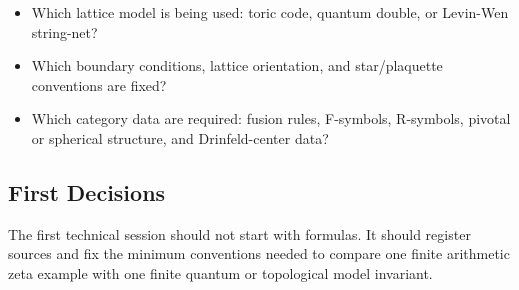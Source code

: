 \begin{itemize}
  \item Which lattice model is being used: toric code, quantum double, or
  Levin-Wen string-net?
  \item Which boundary conditions, lattice orientation, and star/plaquette
  conventions are fixed?
  \item Which category data are required: fusion rules, F-symbols, R-symbols,
  pivotal or spherical structure, and Drinfeld-center data?
\end{itemize}

\subsection{First Decisions}

The first technical session should not start with formulas. It should register
sources and fix the minimum conventions needed to compare one finite
arithmetic zeta example with one finite quantum or topological model invariant.
